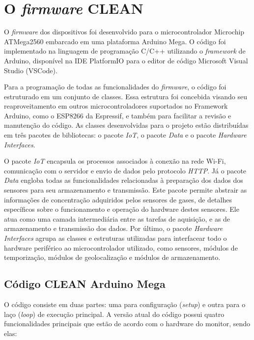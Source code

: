 \chapter{O \textit{firmware} CLEAN}\label{appendix: firmware}

O \textit{firmware} dos dispositivos foi desenvolvido para o microcontrolador Microchip ATMega2560 embarcado em uma plataforma Arduino Mega. O código foi implementado na linguagem de programação C/C++ utilizando o \textit{framework} de Arduino, disponível na IDE PlatformIO para o editor de código Microsoft Visual Studio (VSCode).

Para a programação de todas as funcionalidades do \textit{firmware}, o código foi estruturado em um conjunto de classes. Essa estrutura foi concebida visando seu reaproveitamento em outros microcontroladores suportados no Framework Arduino, como o ESP8266 da Espressif, e também para facilitar a revisão e manutenção do código. As classes desenvolvidas para o projeto estão distribuídas em três pacotes de bibliotecas: o pacote \textit{IoT}, o pacote \textit{Data} e o pacote \textit{Hardware Interfaces}.

O pacote \textit{IoT} encapsula os processos associados à conexão na rede Wi-Fi, comunicação com o servidor e envio de dados pelo protocolo \textit{HTTP}. Já o pacote \textit{Data} engloba todas as funcionalidades relacionadas à preparação dos dados dos sensores para seu armazenamento e transmissão. Este pacote permite abstrair as informações de concentração adquiridos pelos sensores de gases, de detalhes específicos sobre o funcionamento e operação do hardware destes sensores. Ele atua como uma camada intermediária entre as tarefas de aquisição, e as de armazenamento e transmissão dos dados. Por último, o pacote \textit{Hardware Interfaces} agrupa as classes e estruturas utilizadas para interfacear todo o hardware periférico ao microcontrolador utilizado, como sensores, módulos de temporização, módulos de geolocalização e módulos de armazenamento.

\section{Código CLEAN Arduino Mega}

O código consiste em duas partes: uma para configuração (\textit{setup}) e outra para o laço (\textit{loop}) de execução principal. A versão atual do código possui quatro funcionalidades principais que estão de acordo com o hardware do monitor, sendo elas:

